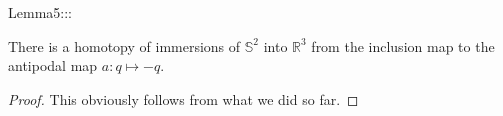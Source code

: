 %


Lemma5:::

\begin{theorem}
    \label{thm:lemma5}
    \leanok
    There is a homotopy of immersions of $𝕊^2$ into $ℝ^3$ from the inclusion map to
    the antipodal map $a : q ↦ -q$.
\end{theorem}
    

\begin{proof}
\leanok
This obviously follows from what we did so far.
\end{proof}